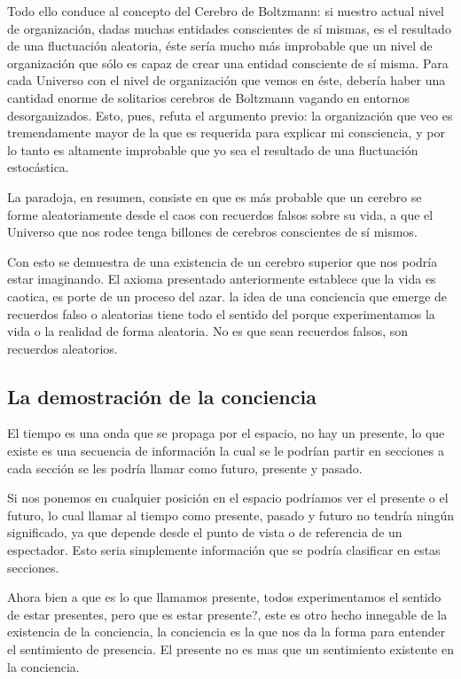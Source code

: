 \documentclass[12pt,letterpaper, a4paper ]{article}
\begin{document}
Todo ello conduce al concepto del Cerebro de Boltzmann: si nuestro actual nivel de organización, dadas muchas entidades conscientes de sí mismas, es el resultado de una fluctuación aleatoria, éste sería mucho más improbable que un nivel de organización que sólo es capaz de crear una entidad consciente de sí misma. Para cada Universo con el nivel de organización que vemos en éste, debería haber una cantidad enorme de solitarios cerebros de Boltzmann vagando en entornos desorganizados. Esto, pues, refuta el argumento previo: la organización que veo es tremendamente mayor de la que es requerida para explicar mi consciencia, y por lo tanto es altamente improbable que yo sea el resultado de una fluctuación estocástica.

La paradoja, en resumen, consiste en que es más probable que un cerebro se forme aleatoriamente desde el caos con recuerdos falsos sobre su vida, a que el Universo que nos rodee tenga billones de cerebros conscientes de sí mismos.

Con esto se demuestra de una existencia de un cerebro superior que nos podría estar imaginando. El axioma presentado anteriormente establece que la vida es caotica, es porte de un proceso del azar. la idea de una conciencia que emerge de recuerdos falso o aleatorias tiene todo el sentido del porque experimentamos la vida o la realidad de forma aleatoria. No es que sean recuerdos falsos, son recuerdos aleatorios.


\subsection{La demostración de la conciencia}

El tiempo es una onda que se propaga por el espacio, no hay un presente, lo que existe es una secuencia de información la cual se le podrían partir en secciones a cada sección se les podría llamar como futuro, presente y pasado.

Si nos ponemos en cualquier posición en el espacio podríamos ver el presente o el futuro, lo cual llamar al tiempo como presente, pasado y futuro no tendría ningún significado, ya que depende desde el punto de vista o de referencia de un espectador.
Esto seria simplemente información que se podría clasificar en estas secciones.


Ahora bien a que es lo que llamamos presente, todos experimentamos el sentido de estar presentes, pero que es estar presente?, este es otro hecho innegable de la existencia de la conciencia, la conciencia es la que nos da
la forma para entender el sentimiento de presencia. El presente no es mas que un sentimiento existente en la conciencia.
\end{document}
